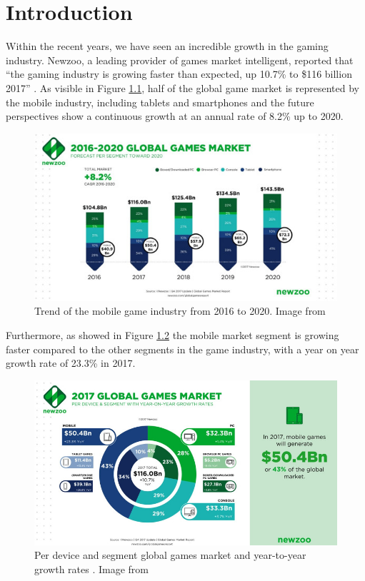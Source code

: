 \chapter{Introduction}
Within the recent years, we have seen an incredible growth in the gaming industry. Newzoo, a leading provider of games market intelligent, reported that “the gaming industry is growing faster than expected, up 10.7\% to \$116 billion 2017” \cite{_newzoo:_????}. As visible in Figure \ref{fig:newzoo2}, half of the global game market is represented by the mobile industry, including tablets and smartphones and the future perspectives show a continuous growth at an annual rate of 8.2\% up to 2020. 
\begin{figure}
    \centering
    \includegraphics{masters-thesis-master/masters-thesis/contents/01_introduction/newzoo-2.jpg}
    \caption{Trend of the mobile game industry from 2016 to 2020. Image from \cite{_newzoo:_????} }
    \label{fig:newzoo2}
\end{figure}
Furthermore, as showed in Figure \ref{fig:newzoo3} the mobile market segment is growing faster compared to the other segments in the game industry, with a year on year growth rate of 23.3\% in 2017.
\begin{figure}
    \centering
    \includegraphics[width=\textwidth]{masters-thesis-master/masters-thesis/contents/01_introduction/newzoo-3.jpg}
    \caption{Per device and segment global games market and year-to-year growth rates . Image from \cite{_newzoo:_????} }
    \label{fig:newzoo3}
\end{figure}
